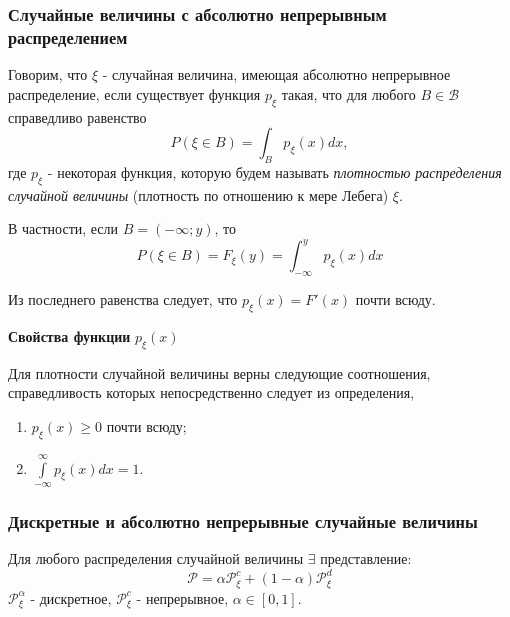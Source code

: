 \subsubsection{Случайные величины с абсолютно непрерывным распределением}

\begin{definition}
	Говорим, что $\xi$ - случайная величина, имеющая абсолютно непрерывное распределение, если существует функция $p_{\xi}$ такая, что для любого $B \in \mathcal{B}$ справедливо равенство
	\[ P(\xi \in B) = \int_B p_{\xi} (x) dx, \]
	где $p_{\xi}$ - некоторая функция, которую будем называть \textit{плотностью распределения случайной величины} (плотность по отношению к мере Лебега) $\xi$.
	
	В частности, если $B = (-\infty; y)$, то
	\[ P(\xi \in B) = F_{\xi} (y) = \int_{-\infty}^{y} p_{\xi} (x) dx \]
	
	Из последнего равенства следует, что $p_{\xi} (x) = F' (x)$ почти всюду.
\end{definition}

\textbf{Свойства функции} $p_{\xi} (x)$

Для плотности случайной величины верны следующие соотношения, справедливость которых непосредственно следует из определения,
\begin{enumerate}
	\item $p_{\xi} (x) \ge 0$ почти всюду;
	\item $\int\limits_{-\infty}^{\infty} p_{\xi} (x) dx = 1$.
\end{enumerate}

\subsubsection{Дискретные и абсолютно непрерывные случайные величины}

\begin{figure}[h]
\end{figure}
Для любого распределения случайной величины $\exists$ представление:
\[ \mathcal{P} = \alpha \mathcal{P}_{\xi}^c + (1 - \alpha) \mathcal{P}_{\xi}^{d} \]
$\mathcal{P}_{\xi}^{\alpha}$ - дискретное, $\mathcal{P}_{\xi}^{c}$ - непрерывное, $\alpha \in [0, 1]$.

